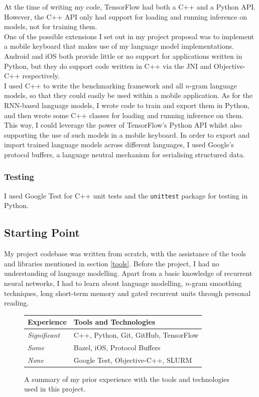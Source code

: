 \documentclass[a4paper, 12pt]{report}
\newcommand{\tbf}[1]{\textbf{#1}}
\newcommand{\ttt}[1]{\texttt{#1}}
\newcommand{\tit}[1]{\textit{#1}}
\begin{document}
At the time of writing my code, TensorFlow had both a C++ and a Python API. However, the C++ API only had support for loading and running inference on models, not for training them. \\

One of the possible extensions I set out in my project proposal was to implement a mobile keyboard that makes use of my language model implementations. Android and iOS both provide little or no support for applications written in Python, but they do support code written in C++ via the JNI and Objective-C++ respectively. \\

I used C++ to write the benchmarking framework and all $n$-gram language models, so that they could easily be used within a mobile application. As for the RNN-based language models, I wrote code to train and export them in Python, and then wrote some C++ classes for loading and running inference on them. This way, I could leverage the power of TensorFlow's Python API whilst also supporting the use of such models in a mobile keyboard. In order to export and import trained language models across different languages, I used Google's protocol buffers, a language neutral mechanism for serialising structured data.

\subsubsection{Testing}

I used Google Test for C++ unit tests and the \ttt{unittest} package for testing in Python.

\subsection{Starting Point}

My project codebase was written from scratch, with the assistance of the tools and libraries mentioned in section \ref{tools}. Before the project, I had no understanding of language modelling. Apart from a basic knowledge of recurrent neural networks, I had to learn about language modelling, $n$-gram smoothing techniques, long short-term memory and gated recurrent units through personal reading. \\

\begin{figure}[h]
\captionsetup{justification=centering}
\centering
\begin{tabular}{| l | l |}
	\hline
	\tbf{Experience} & \tbf{Tools and Technologies} \\ \hline
	\tit{Significant} & C++, Python, Git, GitHub, TensorFlow \\
	\tit{Some} & Bazel, iOS, Protocol Buffers \\
	\tit{None} & Google Test, Objective-C++, SLURM \\ \hline
\end{tabular}
\caption{A summary of my prior experience with the tools and technologies used in this project.}
\end{figure}
\end{document}
